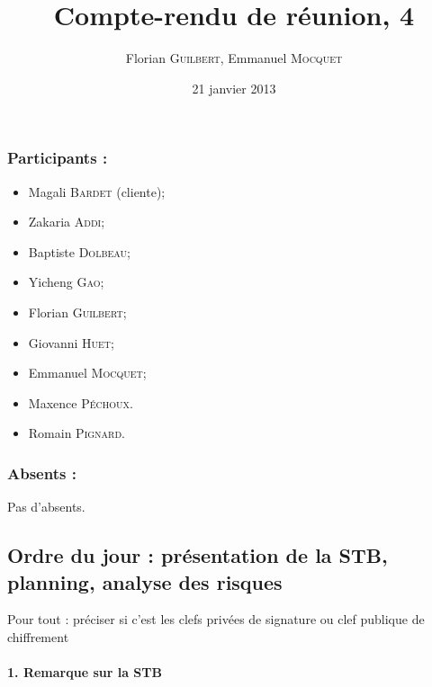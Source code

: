 \documentclass[a4paper,10pt]{article}
\author{Florian \textsc{Guilbert}, Emmanuel \textsc{Mocquet}}
\title{Compte-rendu de réunion, 4}
\date{21 janvier 2013}
\begin{document}
\maketitle

\subsubsection*{Participants : }
\begin{itemize}
    \item Magali \textsc{Bardet} (cliente);
    \item Zakaria \textsc{Addi};
    \item Baptiste \textsc{Dolbeau};
    \item Yicheng \textsc{Gao};
    \item Florian \textsc{Guilbert};
    \item Giovanni \textsc{Huet};
    \item Emmanuel \textsc{Mocquet};
    \item Maxence  \textsc{Péchoux}.
    \item Romain \textsc{Pignard}.
\end{itemize}

\subsubsection*{Absents : }
Pas d'absents.

\subsection*{Ordre du jour : présentation de la STB, planning, analyse 
des risques}

Pour tout :  préciser si c'est les clefs privées de signature ou clef publique
de chiffrement

\paragraph{1. Remarque sur la STB}
\end{document}
